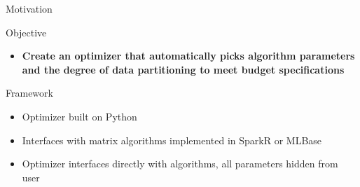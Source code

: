 \documentclass[final]{beamer}
\begin{document}
{\begin{frame}{}
\begin{center}
\begin{columns}[t]
\begin{column}{0.32\textwidth}
\begin{block}{\huge Motivation}
\end{block}

    \begin{block}{\huge Objective}
\vspace{.4cm}
\begin{itemize}
\item {\bf \large Create an optimizer that automatically picks algorithm parameters and the degree of data partitioning to meet budget specifications}
\end{itemize}

\vspace{.5cm}

\end{block}

\vspace{1.2cm}

    \begin{block}{\huge Framework}
\vspace{.5cm}
\begin{itemize}
\item Optimizer built on Python
\item Interfaces with matrix algorithms implemented in SparkR or MLBase
\item Optimizer interfaces directly with algorithms, all parameters hidden from user
\end{itemize}    
\begin{center}
\begin{figure}
\end{figure}
\end{center}
\end{block}



\end{column}
\end{columns}
\end{center}
\end{frame}}
\end{document}

